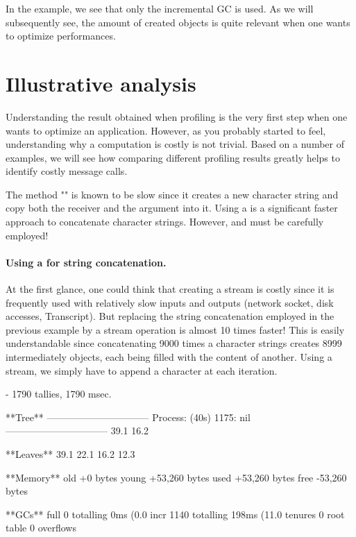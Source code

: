 \documentclass[a4paper,10pt,twoside]{book}
\begin{document}
In the example, we see that only the incremental GC is used. As we will subsequently see, the amount of created objects is quite relevant when one wants to optimize performances.

\section{Illustrative analysis}

Understanding the result obtained when profiling is the very first step when one wants to optimize an application. However, as you probably started to feel, understanding why a computation is costly is not trivial. Based on a number of examples, we will see how comparing different profiling results greatly helps to identify costly message calls. 

The method "\ct{,}" is known to be slow since it creates a new character string and copy both the receiver and the argument into it. Using a  is a significant faster approach to concatenate character strings. However,  and  must be carefully employed!


\paragraph{Using a  for string concatenation.}
At the first glance, one could think that creating a stream is costly since it is frequently used with relatively slow inputs and outputs (\eg network socket, disk accesses, Transcript). But replacing the string concatenation employed in the previous example by a stream operation is almost 10 times faster! This is easily understandable since concatenating 9000 times a character strings creates 8999 intermediately objects, each being filled with the content of another. Using a stream, we simply have to append a character at each iteration.


\begin{code}{}
 - 1790 tallies, 1790 msec.

**Tree**
--------------------------------
Process: (40s)  1175: nil
--------------------------------
39.1%
16.2%

**Leaves**
39.1%
22.1%
16.2%
12.3%

**Memory**
	old			+0 bytes
	young		+53,260 bytes
	used		+53,260 bytes
	free		-53,260 bytes

**GCs**
	full			0 totalling 0ms (0.0%
	incr		1140 totalling 198ms (11.0%
	tenures		0
	root table	0 overflows
\end{code}
\end{document}
